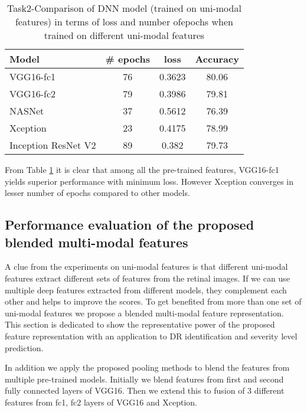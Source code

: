 \documentclass[electronics,article,accept ,moreauthors,pdftex]{mdpi}
\begin{document}
\begin{table}[htbp]
    \begin{center}
\caption{Task2-Comparison of DNN model (trained on uni-modal features) in terms of loss and number ofepochs when trained on different uni-modal features }    \renewcommand{\arraystretch}{1.5}        \small        \begin{tabular}{|l|c|c|c|} \hline        \textbf{Model} & \textbf{\# epochs} & \textbf{loss} & \textbf{Accuracy}  \\ \hline
            VGG16-fc1 & 76 & 0.3623 & 80.06 \\ \hline
            VGG16-fc2 &    79 & 0.3986 & 79.81  \\ \hline
            NASNet    & 37 & 0.5612 & 76.39 \\ \hline
            Xception & 23 & 0.4175 & 78.99 \\ \hline
            Inception ResNet V2    & 89 & 0.382 & 79.73 \\ \hline    \end{tabular}      \label{tab:result_task2_uni_epochs}
    \end{center}
\end{table}
From Table \ref{tab:result_task2_uni_epochs} it is clear that  among all the pre-trained features, VGG16-fc1 yields superior performance with minimum loss. However Xception converges in lesser number of epochs compared to other models.
\subsection{Performance evaluation of the proposed blended multi-modal features}
A clue from the experiments on uni-modal features is that different uni-modal features extract different sets of features from the retinal images.  If we can use multiple deep features extracted from different models, they complement each other and helps to improve the scores.
To get benefited from more than one set of uni-modal features we propose a blended multi-modal feature representation. This section is dedicated to show the representative power of the proposed feature representation with an application to DR identification and severity level prediction.

In addition we apply the proposed pooling methods to blend the features from multiple pre-trained models. Initially we blend features from first and second fully connected layers of VGG16. Then we extend this to fusion of 3 different features from fc1, fc2 layers of VGG16 and Xception.
\end{document}
